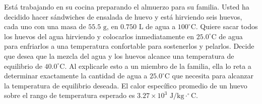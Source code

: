 \item Está trabajando en su cocina preparando el almuerzo para su familia. Usted ha decidido hacer sándwiches de ensalada de huevo y está hirviendo seis huevos, cada uno con una masa de $55.5 \text{ g}$, en $0.750 \text{ L}$ de agua a $100 ^\circ\text{C}$. Quiere sacar todos los huevos del agua hirviendo y colocarlos inmediatamente en $25.0 ^\circ\text{C}$ de agua para enfriarlos a una temperatura confortable para sostenerlos y pelarlos. Decide que desea que la mezcla del agua y los huevos alcance una temperatura de equilibrio de $40.0 ^\circ\text{C}$. Al explicarle esto a un miembro de la familia, ella lo reta a determinar exactamente la cantidad de agua a $25.0 ^\circ\text{C}$ que necesita para alcanzar la temperatura de equilibrio deseada. El calor específico promedio de un huevo sobre el rango de temperatura esperado es $3.27 \times 10^3 \text{ J/kg}\cdot^\circ\text{C}$.
